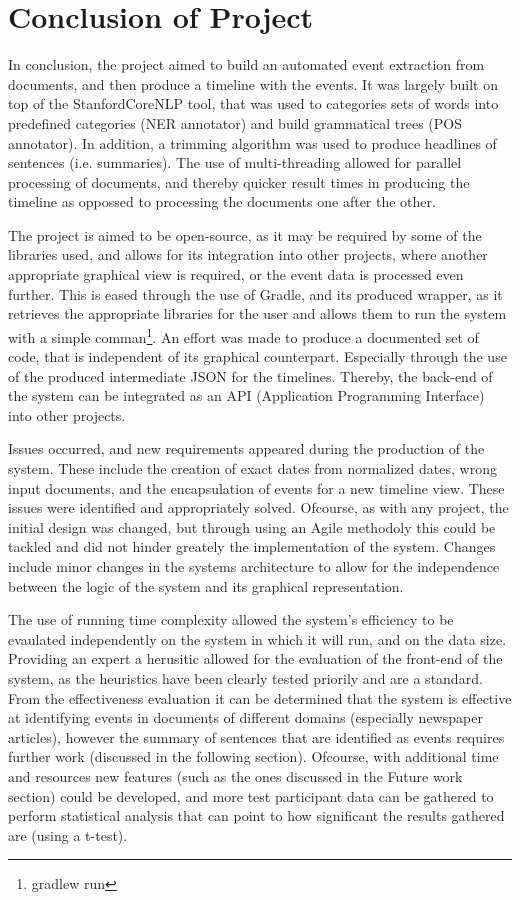 \section{Conclusion of Project}
\par In conclusion, the project aimed to build an automated event extraction from documents, and then produce a timeline with the events. It was largely built on top of the StanfordCoreNLP tool, that was used to categories sets of words into predefined categories (NER annotator) and build grammatical trees (POS annotator). In addition, a trimming algorithm was used to produce headlines of sentences (i.e. summaries). The use of multi-threading allowed for parallel processing of documents, and thereby quicker result times in producing the timeline as oppossed to processing the documents one after the other. 
\par The project is aimed to be open-source, as it may be required by some of the libraries used, and allows for its integration into other projects, where another appropriate graphical view is required, or the event data is processed even further. This is eased through the use of Gradle, and its produced wrapper, as it retrieves the appropriate libraries for the user and allows them to run the system with a simple comman\footnote{gradlew run}. An effort was made to produce a documented set of code, that is independent of its graphical counterpart. Especially through the use of the produced intermediate JSON for the timelines. Thereby, the back-end of the system can be integrated as an API (Application Programming Interface) into other projects. 
\par Issues occurred, and new requirements appeared during the production of the system. These include the creation of exact dates from normalized dates, wrong input documents, and the encapsulation of events for a new timeline view. These issues were identified and appropriately solved. Ofcourse, as with any project, the initial design was changed, but through using an Agile methodoly this could be tackled and did not hinder greately the implementation of the system. Changes include minor changes in the systems architecture to allow for the independence between the logic of the system and its graphical representation.
\par The use of running time complexity allowed the system's efficiency to be evaulated independently on the system in which it will run, and on the data size. Providing an expert a herusitic allowed for the evaluation of the front-end of the system, as the heuristics have been clearly tested priorily and are a standard. From the effectiveness evaluation it can be determined that the system is effective at identifying events in documents of different domains (especially newspaper articles), however the summary of sentences that are identified as events requires further work (discussed in the following section). Ofcourse, with additional time and resources new features (such as the ones discussed in the Future work section) could be developed, and more test participant data can be gathered to perform statistical analysis that can point to how significant the results gathered are (using a t-test). 
\par 
